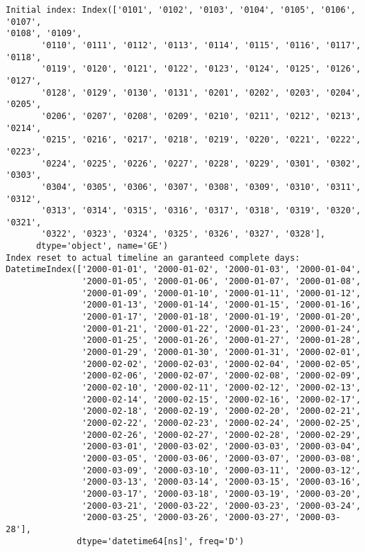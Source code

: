 \documentclass[11pt]{article}
\begin{document}
    \begin{Verbatim}[commandchars=\\\{\}]
Initial index: Index(['0101', '0102', '0103', '0104', '0105', '0106', '0107',
'0108', '0109',
       '0110', '0111', '0112', '0113', '0114', '0115', '0116', '0117', '0118',
       '0119', '0120', '0121', '0122', '0123', '0124', '0125', '0126', '0127',
       '0128', '0129', '0130', '0131', '0201', '0202', '0203', '0204', '0205',
       '0206', '0207', '0208', '0209', '0210', '0211', '0212', '0213', '0214',
       '0215', '0216', '0217', '0218', '0219', '0220', '0221', '0222', '0223',
       '0224', '0225', '0226', '0227', '0228', '0229', '0301', '0302', '0303',
       '0304', '0305', '0306', '0307', '0308', '0309', '0310', '0311', '0312',
       '0313', '0314', '0315', '0316', '0317', '0318', '0319', '0320', '0321',
       '0322', '0323', '0324', '0325', '0326', '0327', '0328'],
      dtype='object', name='GE')
Index reset to actual timeline an garanteed complete days:
DatetimeIndex(['2000-01-01', '2000-01-02', '2000-01-03', '2000-01-04',
               '2000-01-05', '2000-01-06', '2000-01-07', '2000-01-08',
               '2000-01-09', '2000-01-10', '2000-01-11', '2000-01-12',
               '2000-01-13', '2000-01-14', '2000-01-15', '2000-01-16',
               '2000-01-17', '2000-01-18', '2000-01-19', '2000-01-20',
               '2000-01-21', '2000-01-22', '2000-01-23', '2000-01-24',
               '2000-01-25', '2000-01-26', '2000-01-27', '2000-01-28',
               '2000-01-29', '2000-01-30', '2000-01-31', '2000-02-01',
               '2000-02-02', '2000-02-03', '2000-02-04', '2000-02-05',
               '2000-02-06', '2000-02-07', '2000-02-08', '2000-02-09',
               '2000-02-10', '2000-02-11', '2000-02-12', '2000-02-13',
               '2000-02-14', '2000-02-15', '2000-02-16', '2000-02-17',
               '2000-02-18', '2000-02-19', '2000-02-20', '2000-02-21',
               '2000-02-22', '2000-02-23', '2000-02-24', '2000-02-25',
               '2000-02-26', '2000-02-27', '2000-02-28', '2000-02-29',
               '2000-03-01', '2000-03-02', '2000-03-03', '2000-03-04',
               '2000-03-05', '2000-03-06', '2000-03-07', '2000-03-08',
               '2000-03-09', '2000-03-10', '2000-03-11', '2000-03-12',
               '2000-03-13', '2000-03-14', '2000-03-15', '2000-03-16',
               '2000-03-17', '2000-03-18', '2000-03-19', '2000-03-20',
               '2000-03-21', '2000-03-22', '2000-03-23', '2000-03-24',
               '2000-03-25', '2000-03-26', '2000-03-27', '2000-03-28'],
              dtype='datetime64[ns]', freq='D')
    \end{Verbatim}
\end{document}
